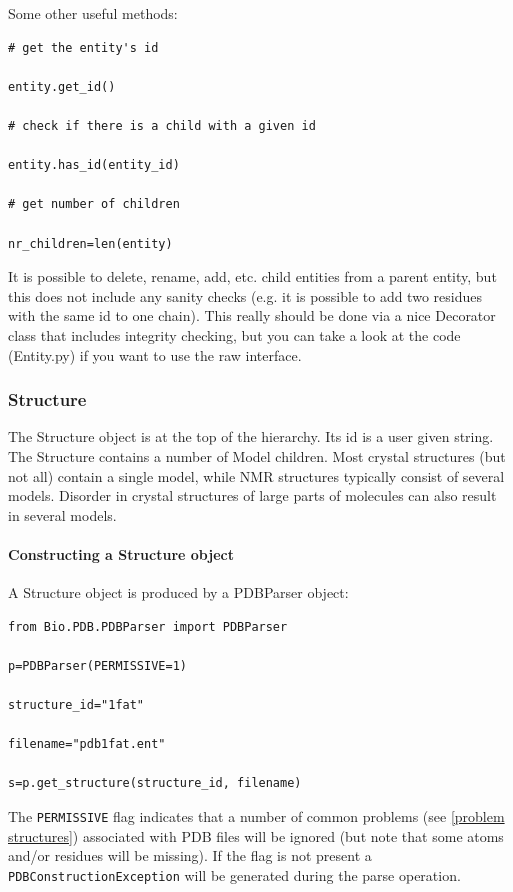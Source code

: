 \documentclass{report}
\begin{document}
Some other useful methods:

\begin{verbatim}
# get the entity's id

entity.get_id()

# check if there is a child with a given id

entity.has_id(entity_id)

# get number of children

nr_children=len(entity)
\end{verbatim}

It is possible to delete, rename, add, etc. child entities from a parent entity,
but this does not include any sanity checks (e.g. it is possible to add two
residues with the same id to one chain). This really should be done via a nice
Decorator class that includes integrity checking, but you can take a look at
the code (Entity.py) if you want to use the raw interface. 

\subsubsection{Structure}

The Structure object is at the top of the hierarchy. Its id is a user given
string. The Structure contains a number of Model children. Most crystal structures
(but not all) contain a single model, while NMR structures typically consist
of several models. Disorder in crystal structures of large parts of molecules
can also result in several models. 

\paragraph{Constructing a Structure object}

A Structure object is produced by a PDBParser object:

\begin{verbatim}
from Bio.PDB.PDBParser import PDBParser

p=PDBParser(PERMISSIVE=1)

structure_id="1fat"

filename="pdb1fat.ent"

s=p.get_structure(structure_id, filename)
\end{verbatim}

The {\tt PERMISSIVE} flag indicates that a number of common problems (see \ref{problem structures})
associated with PDB files will be ignored (but note that some atoms and/or residues
will be missing). If the flag is not present a {\tt PDBConstructionException}
will be generated during the parse operation.
\end{document}
